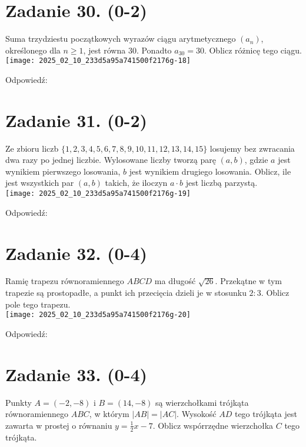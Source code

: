 \documentclass[10pt]{article}
\begin{document}
\section*{Zadanie 30. (0-2)}
Suma trzydziestu początkowych wyrazów ciągu arytmetycznego \(\left(a_{n}\right)\), określonego dla \(n \geq 1\), jest równa 30. Ponadto \(a_{30}=30\). Oblicz różnicę tego ciągu.\\
\texttt{[image: 2025\_02\_10\_233d5a95a741500f2176g-18]}

Odpowiedź:

\section*{Zadanie 31. (0-2)}
Ze zbioru liczb \(\{1,2,3,4,5,6,7,8,9,10,11,12,13,14,15\}\) losujemy bez zwracania dwa razy po jednej liczbie. Wylosowane liczby tworzą parę \((a, b)\), gdzie \(a\) jest wynikiem pierwszego losowania, \(b\) jest wynikiem drugiego losowania. Oblicz, ile jest wszystkich par \((a, b)\) takich, że iloczyn \(a \cdot b\) jest liczbą parzystą.\\
\texttt{[image: 2025\_02\_10\_233d5a95a741500f2176g-19]}

Odpowiedź: \(\qquad\)

\section*{Zadanie 32. (0-4)}
Ramię trapezu równoramiennego \(A B C D\) ma długość \(\sqrt{26}\). Przekątne w tym trapezie są prostopadłe, a punkt ich przecięcia dzieli je w stosunku \(2: 3\). Oblicz pole tego trapezu.\\
\texttt{[image: 2025\_02\_10\_233d5a95a741500f2176g-20]}

Odpowiedź:

\section*{Zadanie 33. (0-4)}
Punkty \(A=(-2,-8)\) i \(B=(14,-8)\) są wierzchołkami trójkąta równoramiennego \(A B C\), w którym \(|A B|=|A C|\). Wysokość \(A D\) tego trójkąta jest zawarta w prostej o równaniu \(y=\frac{1}{2} x-7\). Oblicz wspórrzędne wierzchołka \(C\) tego trójkąta.
\end{document}

